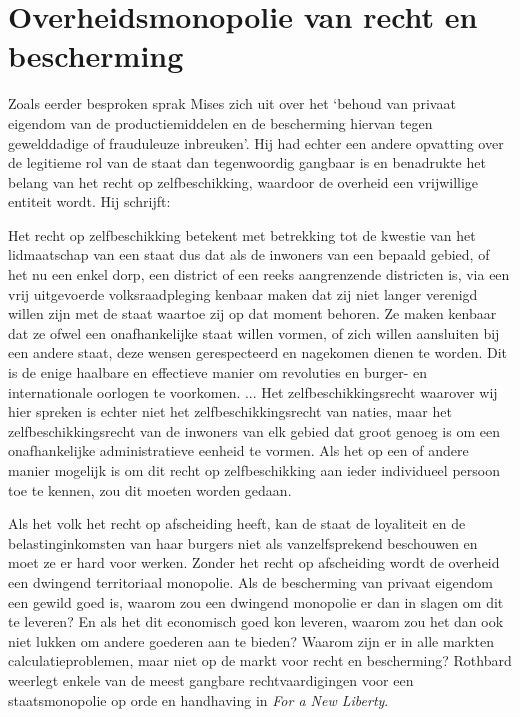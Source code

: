 \hypertarget{overheidsmonopolie-van-recht-en-bescherming}{%
\section{Overheidsmonopolie van recht en bescherming}\label{overheidsmonopolie-van-recht-en-bescherming}}

Zoals eerder besproken sprak Mises zich uit over het `behoud van privaat eigendom van de productiemiddelen en de bescherming hiervan tegen gewelddadige of frauduleuze inbreuken'. Hij had echter een andere opvatting over de legitieme rol van de staat dan tegenwoordig gangbaar is en benadrukte het belang van het recht op zelfbeschikking, waardoor de overheid een vrijwillige entiteit wordt. Hij schrijft:

\begin{blockquotebox}
Het recht op zelfbeschikking betekent met betrekking tot de kwestie van het lidmaatschap van een staat dus dat als de inwoners van een bepaald gebied, of het nu een enkel dorp, een district of een reeks aangrenzende districten is, via een vrij uitgevoerde volksraadpleging kenbaar maken dat zij niet langer verenigd willen zijn met de staat waartoe zij op dat moment behoren. Ze maken kenbaar dat ze ofwel een onafhankelijke staat willen vormen, of zich willen aansluiten bij een andere staat, deze wensen gerespecteerd en nagekomen dienen te worden. Dit is de enige haalbare en effectieve manier om revoluties en burger- en internationale oorlogen te voorkomen. ... Het zelfbeschikkingsrecht waarover wij hier spreken is echter niet het zelfbeschikkingsrecht van naties, maar het zelfbeschikkingsrecht van de inwoners van elk gebied dat groot genoeg is om een onafhankelijke administratieve eenheid te vormen. Als het op een of andere manier mogelijk is om dit recht op zelfbeschikking aan ieder individueel persoon toe te kennen, zou dit moeten worden gedaan.\footnotemark
\end{blockquotebox}

Als het volk het recht op afscheiding heeft, kan de staat de loyaliteit en de belastinginkomsten van haar burgers niet als vanzelfsprekend beschouwen en moet ze er hard voor werken. Zonder het recht op afscheiding wordt de overheid een dwingend territoriaal monopolie. Als de bescherming van privaat eigendom een gewild goed is, waarom zou een dwingend monopolie er dan in slagen om dit te leveren? En als het dit economisch goed kon leveren, waarom zou het dan ook niet lukken om andere goederen aan te bieden? Waarom zijn er in alle markten calculatieproblemen, maar niet op de markt voor recht en bescherming? Rothbard weerlegt enkele van de meest gangbare rechtvaardigingen voor een staatsmonopolie op orde en handhaving in \emph{For a New Liberty}.\autocite{205}

